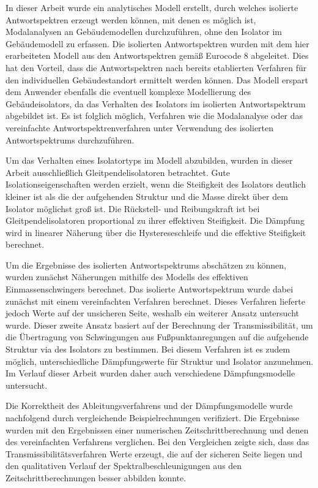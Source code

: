 
In dieser Arbeit wurde ein analytisches Modell erstellt, durch welches isolierte Antwortspektren erzeugt werden können, mit denen es möglich ist, Modalanalysen an Gebäudemodellen durchzuführen, ohne den Isolator im Gebäudemodell zu erfassen.
Die isolierten Antwortspektren wurden mit dem hier erarbeiteten Modell aus den Antwortspektren gemäß Eurocode 8 abgeleitet.
Dies hat den Vorteil, dass die Antwortspektren nach bereits etablierten Verfahren für den individuellen Gebäudestandort ermittelt werden können.
Das Modell erspart dem Anwender ebenfalls die eventuell komplexe Modellierung des Gebäudeisolators, da das Verhalten des Isolators im isolierten Antwortspektrum abgebildet ist.
Es ist folglich möglich, Verfahren wie die Modalanalyse oder das vereinfachte Antwortspektrenverfahren unter Verwendung des isolierten Antwortspektrums durchzuführen.

Um das Verhalten eines Isolatortyps im Modell abzubilden, wurden in dieser Arbeit ausschließlich Gleitpendelisolatoren betrachtet.
Gute Isolationseigenschaften werden erzielt, wenn die Steifigkeit des Isolators deutlich kleiner ist als die der aufgehenden Struktur und die Masse direkt über dem Isolator möglichst groß ist.
Die Rückstell- und Reibungskraft ist bei Gleitpendelisolatoren proportional zu ihrer effektiven Steifigkeit.
Die Dämpfung wird in linearer Näherung über die Hystereseschleife und die effektive Steifigkeit berechnet.

Um die Ergebnisse des isolierten Antwortspektrums abschätzen zu können, wurden zunächst Näherungen mithilfe des Modells des effektiven Einmassenschwingers berechnet.
Das isolierte Antwortspektrum wurde dabei zunächst mit einem vereinfachten Verfahren berechnet. Dieses Verfahren lieferte jedoch Werte auf der unsicheren Seite, weshalb ein weiterer Ansatz untersucht wurde.
Dieser zweite Ansatz basiert auf der Berechnung der Transmissibilität, um die Übertragung von Schwingungen aus Fußpunktanregungen auf die aufgehende Struktur via des Isolators zu bestimmen.
Bei diesem  Verfahren ist es zudem möglich, unterschiedliche Dämpfungswerte für Struktur und Isolator anzunehmen.
Im Verlauf dieser Arbeit wurden daher auch verschiedene Dämpfungsmodelle untersucht.

Die Korrektheit des Ableitungsverfahrens und der Dämpfungsmodelle wurde nachfolgend durch vergleichende Beispielrechnungen verifiziert.
Die Ergebnisse wurden mit den Ergebnissen einer numerischen Zeitschrittberechnung und denen des vereinfachten Verfahrens verglichen.
Bei den Vergleichen zeigte sich, dass das Transmissibilitätsverfahren Werte erzeugt, die auf der sicheren Seite liegen und den qualitativen Verlauf der Spektralbeschleunigungen aus den Zeitschrittberechnungen besser abbilden konnte.

